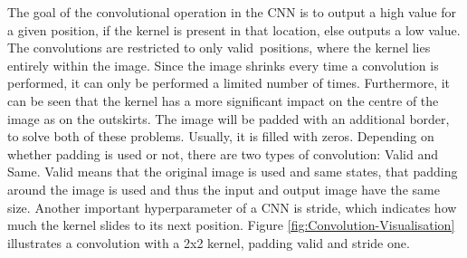 The goal of the convolutional operation in the \gls{CNN} is to output a high value for a given position, if the kernel is present in that location, else outputs a low value. The convolutions are restricted to only \flqq valid\frqq \ positions, where the kernel lies entirely within the image. Since the image shrinks every time a convolution is performed, it can only be performed a limited number of times. Furthermore, it can be seen that the kernel has a more significant impact on the centre of the image as on the outskirts. The image will be padded with an additional border, to solve both of these problems. Usually, it is filled with zeros. Depending on whether padding is used or not, there are two types of convolution: Valid and Same. Valid means that the original image is used and same states, that padding around the image is used and thus the input and output image have the same size. Another important hyperparameter of a \gls{CNN} is stride, which indicates how much the kernel slides to its next position. Figure \ref{fig:Convolution-Visualisation} illustrates a convolution with a 2x2 kernel, padding valid and stride one. 

